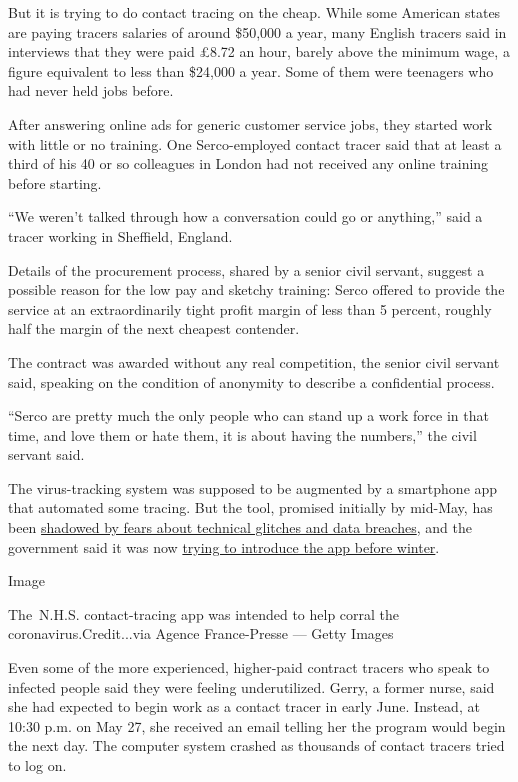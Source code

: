 But it is trying to do contact tracing on the cheap. While some American
states are paying tracers salaries of around \$50,000 a year, many
English tracers said in interviews that they were paid £8.72 an hour,
barely above the minimum wage, a figure equivalent to less than \$24,000
a year. Some of them were teenagers who had never held jobs before.

After answering online ads for generic customer service jobs, they
started work with little or no training. One Serco-employed contact
tracer said that at least a third of his 40 or so colleagues in London
had not received any online training before starting.

``We weren't talked through how a conversation could go or anything,''
said a tracer working in Sheffield, England.

Details of the procurement process, shared by a senior civil servant,
suggest a possible reason for the low pay and sketchy training: Serco
offered to provide the service at an extraordinarily tight profit margin
of less than 5 percent, roughly half the margin of the next cheapest
contender.

The contract was awarded without any real competition, the senior civil
servant said, speaking on the condition of anonymity to describe a
confidential process.

``Serco are pretty much the only people who can stand up a work force in
that time, and love them or hate them, it is about having the numbers,''
the civil servant said.

The virus-tracking system was supposed to be augmented by a smartphone
app that automated some tracing. But the tool, promised initially by
mid-May, has been
\href{https://www.nytimes3xbfgragh.onion/2020/05/07/world/europe/uk-coronavirus-contact-tracing.html}{shadowed
by fears about technical glitches and data breaches}, and the government
said it was now
\href{https://twitter.com/rowlsmanthorpe/status/1273276669541916674}{trying
to introduce the app before winter}.

Image

The~N.H.S. contact-tracing app was intended to help corral the
coronavirus.Credit...via Agence France-Presse --- Getty Images

Even some of the more experienced, higher-paid contract tracers who
speak to infected people said they were feeling underutilized. Gerry, a
former nurse, said she had expected to begin work as a contact tracer in
early June. Instead, at 10:30 p.m. on May 27, she received an email
telling her the program would begin the next day. The computer system
crashed as thousands of contact tracers tried to log on.

